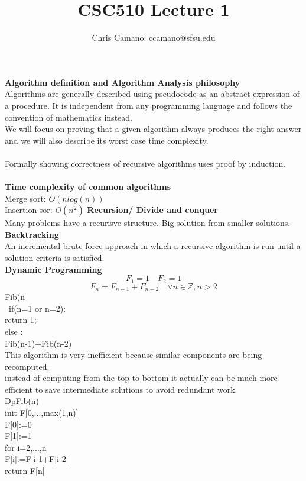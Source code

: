 \documentclass[12pt]{article}
\author{Chris Camano: ccamano@sfsu.edu}
\title{CSC510 Lecture 1 }
\date
\begin{document}
\maketitle
\textbf{Algorithm definition and Algorithm Analysis philosophy}\\
Algorithms are generally described using pseudocode as an abstract expression of a procedure. It is independent from any programming language and follows the convention of mathematics instead. \\
We will focus on proving that a given algorithm always produces the right answer and we will also describe its worst case time complexity.\\\\
Formally showing correctness of recursive algorithms uses proof by induction.
\\\\
\textbf{Time complexity of common algorithms}\\
Merge sort: $O(nlog(n))$\\
Insertion sor: $O(n^2)$
\textbf{Recursion/ Divide and conquer}\\
Many problems have a recurisve structure. Big solution from smaller solutions.
\textbf{Backtracking }\\
An incremental brute force approach in which a recursive algorithm is run until a solution criteria is satisfied.\\
\textbf{Dynamic Programming}
\[
  F_1=1 \quad F_2=1
\]
\[
  F_n=F_{n-1}+F_{n-2} \quad \forall n \in \mathbb{Z}, n>2
\]
  Fib(n\\
   \ if(n=1 or n=2):\\
   \quad\quad return 1;\\
   \quad else : \\
   \quadreturn Fib(n-1)+Fib(n-2)\\
This algorithm is very inefficient because similar components are being recomputed. \\
instead of computing from the top to bottom it actually can be much more efficient to save intermediate solutions to avoid redundant work. \\
DpFib(n)\\
init F[0,...,max(1,n)]\\
F[0]:=0\\
F[1]:=1\\
for i=2,...,n\\
F[i]:=F[i-1+F[i-2]\\
return F[n]\\\\
\end{document}
